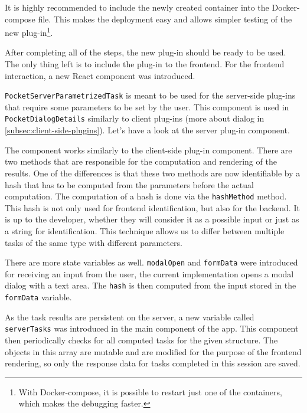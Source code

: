 It is highly recommended to include the newly created container into the Docker-compose file. This makes the deployment easy and allows simpler testing of the new plug-in\footnote{With Docker-compose, it is possible to restart just one of the containers, which makes the debugging faster.}.

After completing all of the steps, the new plug-in should be ready to be used. The only thing left is to include the plug-in to the frontend. For the frontend interaction, a new React component was introduced.

\texttt{PocketServerParametrizedTask} is meant to be used for the server-side plug-ins that require some parameters to be set by the user. This component is used in \texttt{PocketDialogDetails} similarly to client plug-ins (more about dialog in \cref{subsec:client-side-plugins}). Let's have a look at the server plug-in component.



The component works similarly to the client-side plug-in component. There are two methods that are responsible for the computation and rendering of the results. One of the differences is that these two methods are now identifiable by a hash that has to be computed from the parameters before the actual computation. The computation of a hash is done via the \texttt{hashMethod} method. This hash is not only used for frontend identification, but also for the backend. It is up to the developer, whether they will consider it as a possible input or just as a string for identification. This technique allows us to differ between multiple tasks of the same type with different parameters.

There are more state variables as well. \texttt{modalOpen} and \texttt{formData} were introduced for receiving an input from the user, the current implementation opens a modal dialog with a text area. The \texttt{hash} is then computed from the input stored in the \texttt{formData} variable.

As the task results are persistent on the server, a new variable called \texttt{serverTasks} was introduced in the main component of the app. This component then periodically checks for all computed tasks for the given structure. The objects in this array are mutable and are modified for the purpose of the frontend rendering, so only the response data for tasks completed in this session are saved.

